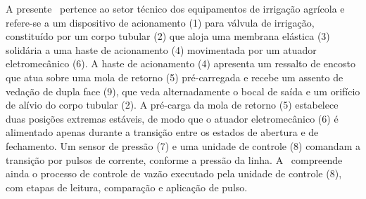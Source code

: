 
A presente \nomedanatureza\ pertence ao setor técnico dos equipamentos de
irrigação agrícola e refere-se a um dispositivo de acionamento (1) para válvula
de irrigação, constituído por um corpo tubular (2) que aloja uma membrana
elástica (3) solidária a uma haste de acionamento (4) movimentada por um
atuador eletromecânico (6). A haste de acionamento (4) apresenta um ressalto de
encosto que atua sobre uma mola de retorno (5) pré-carregada e recebe um
assento de vedação de dupla face (9), que veda alternadamente o bocal de saída
e um orifício de alívio do corpo tubular (2). A pré-carga da mola de retorno
(5) estabelece duas posições extremas estáveis, de modo que o atuador
eletromecânico (6) é alimentado apenas durante a transição entre os estados de
abertura e de fechamento. Um sensor de pressão (7) e uma unidade de controle
(8) comandam a transição por pulsos de corrente, conforme a pressão da linha.
\ifinvencao
A \nomedanatureza\ compreende ainda o processo de controle de vazão executado
pela unidade de controle (8), com etapas de leitura, comparação e aplicação de
pulso.
\fi
